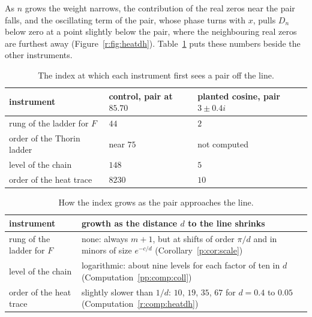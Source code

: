 
As $n$ grows the weight narrows, the contribution of the real zeros near the pair falls, and the oscillating term of the pair, whose phase turns with $x$, pulls $D_n$ below zero at a point slightly below the pair, where the neighbouring real zeros are furthest away (Figure~\ref{r:fig:heatdh}). Table~\ref{r:tab:measured} puts these numbers beside the other instruments.

\begin{table}[ht]
\centering\small
\caption{The index at which each instrument first sees a pair off the line.}\label{r:tab:measured}
\begin{tabular}{@{}p{}p{}p{}@{}}
\toprule
instrument & control, pair at $85.70$ & planted cosine, pair $3\pm0.4i$\\
\midrule
rung of the ladder for $F$ & $44$ & $2$\\[2pt]
order of the Thorin ladder & near $75$ & not computed\\[2pt]
level of the chain & $148$ & $5$\\[2pt]
order of the heat trace & $8230$ & $10$\\
\bottomrule
\end{tabular}
\end{table}

\begin{table}[ht]
\centering\small
\caption{How the index grows as the pair approaches the line.}\label{r:tab:distance}
\begin{tabular}{@{}p{}p{}@{}}
\toprule
instrument & growth as the distance $d$ to the line shrinks\\
\midrule
rung of the ladder for $F$ & none: always $m+1$, but at shifts of order $\pi/d$ and in minors of size $e^{-c/d}$ (Corollary~\ref{p:cor:scale})\\[2pt]
level of the chain & logarithmic: about nine levels for each factor of ten in $d$ (Computation~\ref{pp:comp:coll})\\[2pt]
order of the heat trace & slightly slower than $1/d$: $10$, $19$, $35$, $67$ for $d=0.4$ to $0.05$ (Computation~\ref{r:comp:heatdh})\\
\bottomrule
\end{tabular}
\end{table}


